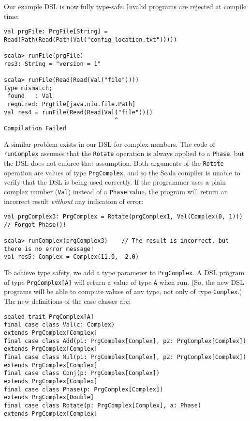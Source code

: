 Our example DSL is now fully type-safe. Invalid
programs are rejected at compile time:
\begin{lstlisting}
val prgFile: PrgFile[String] = Read(Path(Read(Path(Val("config_location.txt")))))

scala> runFile(prgFile)
res3: String = "version = 1"

scala> runFile(Read(Read(Val("file"))))
type mismatch;
 found   : Val
 required: PrgFile[java.nio.file.Path]
val res4 = runFile(Read(Read(Val("file"))))
                                ^
Compilation Failed 
\end{lstlisting}
A similar problem exists in our DSL for complex numbers. The code
of \lstinline!runComplex!
assumes that the \lstinline!Rotate!
operation is always applied to a \lstinline!Phase!,
but the DSL does not enforce that assumption. Both arguments of the
\lstinline!Rotate! operation
are values of type \lstinline!PrgComplex!,
and so the Scala compiler is unable to verify that the DSL is being
used correctly. If the programmer uses a plain complex number (\lstinline!Val!)
instead of a \lstinline!Phase!
value, the program will return an incorrect result \emph{without}
any indication of error:
\begin{lstlisting}
val prgComplex3: PrgComplex = Rotate(prgComplex1, Val(Complex(0, 1)))     // Forgot Phase()!

scala> runComplex(prgComplex3)    // The result is incorrect, but there is no error message!
val res5: Complex = Complex(11.0, -2.0)
\end{lstlisting}
To achieve type safety, we add a type parameter to \lstinline!PrgComplex!.
A DSL program of type \lstinline!PrgComplex[A]!
will return a value of type \lstinline!A!
when run. (So, the new DSL programs will be able to compute values
of any type, not only of type \lstinline!Complex!.)
The new definitions of the case classes are:
\begin{lstlisting}
sealed trait PrgComplex[A]
final case class Val(c: Complex)                                       extends PrgComplex[Complex]
final case class Add(p1: PrgComplex[Complex], p2: PrgComplex[Complex]) extends PrgComplex[Complex]
final case class Mul(p1: PrgComplex[Complex], p2: PrgComplex[Complex]) extends PrgComplex[Complex]
final case class Conj(p: PrgComplex[Complex])                          extends PrgComplex[Complex]
final case class Phase(p: PrgComplex[Complex])                         extends PrgComplex[Double]
final case class Rotate(p: PrgComplex[Complex], a: Phase)              extends PrgComplex[Complex]
\end{lstlisting}

